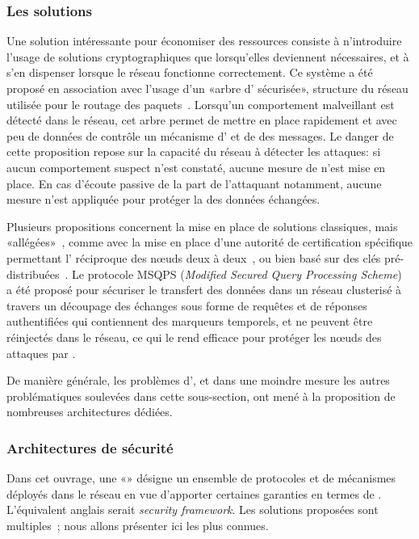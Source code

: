     \subsubsection{Les solutions}
Une solution intéressante pour économiser des ressources consiste à n'introduire l'usage de solutions cryptographiques que lorsqu'elles deviennent nécessaires, et à s'en dispenser lorsque le réseau fonctionne correctement.
Ce système a été proposé en association avec l'usage d'un «arbre d' sécurisée», structure du réseau utilisée pour le routage des paquets~\cite{WDSX07}.
Lorsqu'un comportement malveillant est détecté dans le réseau, cet arbre permet de mettre en place rapidement et avec peu de données de contrôle un mécanisme d' et de  des messages.
Le danger de cette proposition repose sur la capacité du réseau à détecter les attaques: si aucun comportement suspect n'est constaté, aucune mesure de \secu n'est mise en place.
En cas d'écoute passive de la part de l'attaquant notamment, aucune mesure n'est appliquée pour protéger la  des données échangées.

Plusieurs propositions concernent la mise en place de solutions classiques, mais «allégées»~\cite{HWMRKP06}, comme avec la mise en place d'une autorité de certification spécifique permettant l' réciproque des nœuds deux à deux~\cite{GWZCK13}, ou bien basé sur des clés pré-distribuées~\cite{BSK13}.
Le protocole MSQPS (\textit{Modified Secured Query Processing Scheme})~\cite{GD14} a été proposé pour sécuriser le transfert des données dans un réseau clusterisé à travers un découpage des échanges sous forme de requêtes et de réponses authentifiées qui contiennent des marqueurs temporels, et ne peuvent être réinjectés dans le réseau, ce qui le rend efficace pour protéger les nœuds des attaques par .

De manière générale, les problèmes d', et dans une moindre mesure les autres problématiques soulevées dans cette sous-section, ont mené à la proposition de nombreuses architectures dédiées.

    \subsubsection{Architectures de sécurité}\label{ea:sss:archi}
Dans cet ouvrage, une «» désigne un ensemble de protocoles et de mécanismes déployés dans le réseau en vue d'apporter certaines garanties en termes de \secu.
L'équivalent anglais serait \textit{security framework}.
Les solutions proposées sont multiples~\cite{HI12,GWZC13,SS14-rev}; nous allons présenter ici les plus connues.


